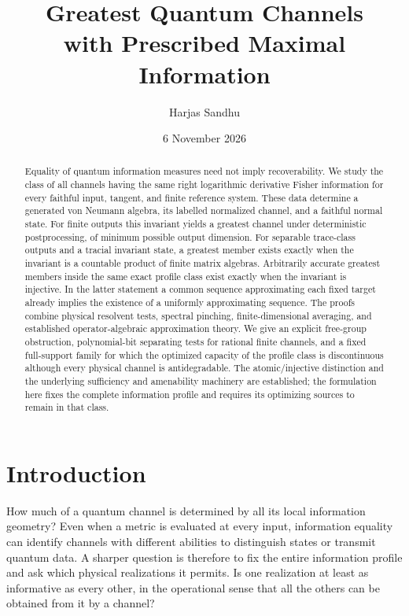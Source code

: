 \documentclass[11pt,reqno]{amsart}
\title[Greatest channels with prescribed maximal information]{Greatest Quantum Channels\\with Prescribed Maximal Information}
\author{Harjas Sandhu}
\date{6 November 2026}
\theoremstyle{definition}
\theoremstyle{remark}
\numberwithin{equation}{section}
\begin{document}
\raggedbottom
\begin{abstract}
Equality of quantum information measures need not imply recoverability. We study the class of all channels having the same right logarithmic derivative Fisher information for every faithful input, tangent, and finite reference system. These data determine a generated von Neumann algebra, its labelled normalized channel, and a faithful normal state. For finite outputs this invariant yields a greatest channel under deterministic postprocessing, of minimum possible output dimension. For separable trace-class outputs and a tracial invariant state, a greatest member exists exactly when the invariant is a countable product of finite matrix algebras. Arbitrarily accurate greatest members inside the same exact profile class exist exactly when the invariant is injective. In the latter statement a common sequence approximating each fixed target already implies the existence of a uniformly approximating sequence. The proofs combine physical resolvent tests, spectral pinching, finite-dimensional averaging, and established operator-algebraic approximation theory. We give an explicit free-group obstruction, polynomial-bit separating tests for rational finite channels, and a fixed full-support family for which the optimized capacity of the profile class is discontinuous although every physical channel is antidegradable. The atomic/injective distinction and the underlying sufficiency and amenability machinery are established; the formulation here fixes the complete information profile and requires its optimizing sources to remain in that class.
\end{abstract}
\maketitle
\setcounter{tocdepth}{1}
\tableofcontents
\clearpage

\section{Introduction}

How much of a quantum channel is determined by all its local information geometry? Even when a metric is evaluated at every input, information equality can identify channels with different abilities to distinguish states or transmit quantum data. A sharper question is therefore to fix the entire information profile and ask which physical realizations it permits. Is one realization at least as informative as every other, in the operational sense that all the others can be obtained from it by a channel?
\end{document}
